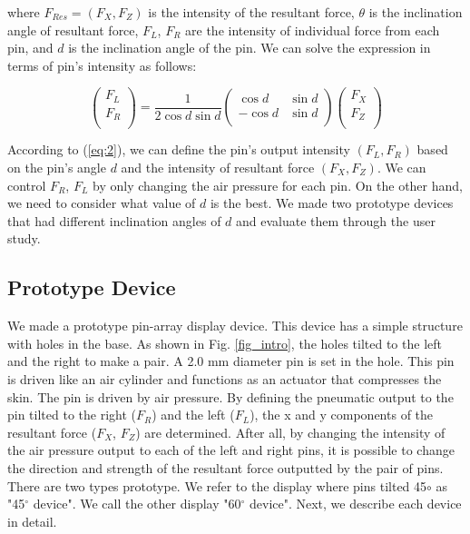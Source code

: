 where $F_{Res} = (F_{X}, F_{Z})$ is the intensity of the resultant force, $\theta$ is the inclination angle of resultant force, $F_{L}$, $F_{R}$ are the intensity of individual force from each pin, and $d$ is the inclination angle of the pin.
We can solve the expression in terms of pin's intensity as follows:

\begin{equation}
\label{eq:2}
\left(
\begin{array}{c}
F_{L} \\
F_{R} \\
\end{array}
\right)
= 
\frac{1}{2\cos{d}\sin{d}}
\left(
\begin{array}{cc}
\cos{d} & \sin{d} \\
-\cos{d} & \sin{d} \\
\end{array}
\right)
\left(
\begin{array}{c}
F_{X} \\
F_{Z} \\
\end{array}
\right)
\end{equation}

According to (\ref{eq:2}), we can define the pin's output intensity $(F_{L}, F_{R})$ based on the pin's angle $d$ and the intensity of resultant force $(F_{X}, F_{Z})$.
We can control $F_{R}$, $F_{L}$ by only changing the air pressure for each pin.
On the other hand, we need to consider what value of $d$ is the best.
We made two prototype devices that had different inclination angles of $d$ and evaluate them through the user study.

\subsection{Prototype Device}

We made a prototype pin-array display device.
This device has a simple structure with holes in the base.
As shown in Fig. \ref{fig_intro}, the holes tilted to the left and the right to make a pair.
A 2.0 mm diameter pin is set in the hole.
This pin is driven like an air cylinder and functions as an actuator that compresses the skin.
The pin is driven by air pressure.
By defining the pneumatic output to the pin tilted to the right ($F_{R}$) and the left ($F_{L}$), the x and y components of the resultant force ($F_{X}$, $F_{Z}$) are determined.
After all, by changing the intensity of the air pressure output to each of the left and right pins, it is possible to change the direction and strength of the resultant force outputted by the pair of pins.
There are two types prototype.
We refer to the display where pins tilted 45${\circ}$ as "45$^{\circ}$ device".
We call the other display "60$^{\circ}$ device".
Next, we describe each device in detail.

